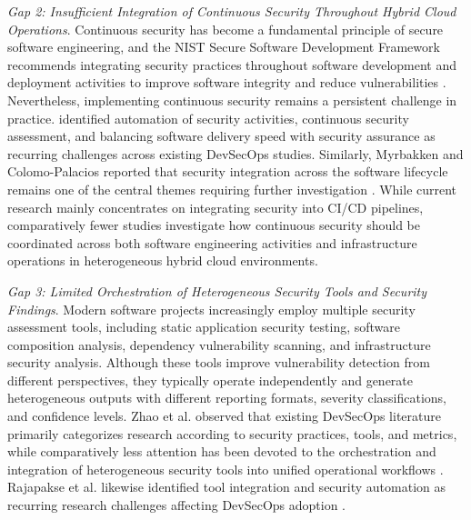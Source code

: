 \textit{Gap 2: Insufficient Integration of Continuous Security Throughout Hybrid Cloud Operations}.
Continuous security has become a fundamental principle of secure software engineering, and the NIST Secure Software Development Framework recommends integrating security practices throughout software development and deployment activities to improve software integrity and reduce vulnerabilities \cite{NISTSSDF2022}. Nevertheless, implementing continuous security remains a persistent challenge in practice. \cite{Rajapakse2021DevSecOpsSLR} identified automation of security activities, continuous security assessment, and balancing software delivery speed with security assurance as recurring challenges across existing DevSecOps studies. Similarly, Myrbakken and Colomo-Palacios reported that security integration across the software lifecycle remains one of the central themes requiring further investigation \cite{Myrbakken2017DevSecOps}. While current research mainly concentrates on integrating security into CI/CD pipelines, comparatively fewer studies investigate how continuous security should be coordinated across both software engineering activities and infrastructure operations in heterogeneous hybrid cloud environments.

\vspace{0.3cm}

\textit{Gap 3: Limited Orchestration of Heterogeneous Security Tools and Security Findings}.
Modern software projects increasingly employ multiple security assessment tools, including static application security testing, software composition analysis, dependency vulnerability scanning, and infrastructure security analysis. Although these tools improve vulnerability detection from different perspectives, they typically operate independently and generate heterogeneous outputs with different reporting formats, severity classifications, and confidence levels. Zhao et al. observed that existing DevSecOps literature primarily categorizes research according to security practices, tools, and metrics, while comparatively less attention has been devoted to the orchestration and integration of heterogeneous security tools into unified operational workflows \cite{Zhao2024DevSecOpsMLR}. Rajapakse et al. likewise identified tool integration and security automation as recurring research challenges affecting DevSecOps adoption \cite{Rajapakse2021DevSecOpsSLR}.

\vspace{0.3cm}

